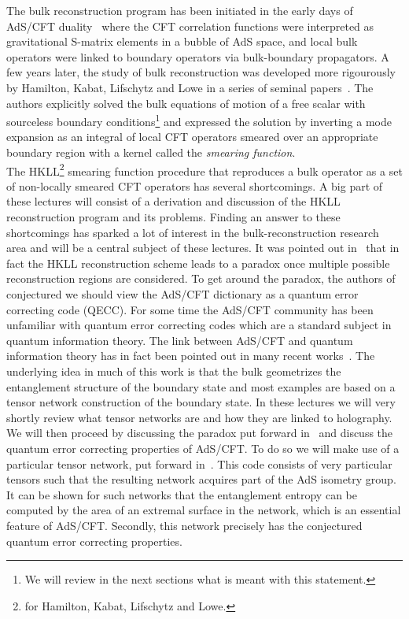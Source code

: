 \documentclass{PoS}
\begin{document}
The bulk reconstruction program has been initiated in the early days of AdS/CFT duality~\cite{Balasubramanian:1999ri,Giddings:1999qu} where the CFT correlation functions were interpreted as gravitational S-matrix elements in a bubble of AdS space, and local bulk operators were linked to boundary operators via bulk-boundary propagators. A few years later, the study of bulk reconstruction was developed more rigourously by Hamilton, Kabat, Lifschytz and Lowe in a series of seminal papers~\cite{Hamilton:2005ju,Hamilton:2006fh,Hamilton:2006az,Hamilton:2007wj}. The authors explicitly solved the bulk equations of motion of a free scalar with sourceless boundary conditions\footnote{We will review in the next sections what is meant with this statement.} and expressed the solution by inverting a mode expansion as an integral of local CFT operators smeared over an appropriate boundary region with a kernel called the \textit{smearing function}.\\

The HKLL\footnote{for Hamilton, Kabat, Lifschytz and Lowe.} smearing function procedure that reproduces a bulk operator as a set of non-locally smeared CFT operators 
has several shortcomings. A big part of these lectures will consist of a derivation and discussion of the HKLL reconstruction program and its problems. Finding an answer to these shortcomings has sparked a lot of interest in the bulk-reconstruction research area and will be a central subject of these lectures. It was pointed out in~\cite{Almheiri:2014lwa} that in fact the HKLL reconstruction scheme leads to a paradox once multiple possible reconstruction regions are considered. To get around the paradox, the authors of~\cite{Almheiri:2014lwa} conjectured we should view the AdS/CFT dictionary as a quantum error correcting code (QECC). For some time the AdS/CFT community has been unfamiliar with quantum error correcting codes which are a standard subject in quantum information theory. The link between AdS/CFT and quantum information theory has in fact been pointed out in many recent works~\cite{Swingle:2009bg,Swingle:2012wq,Qi:2013caa}. The underlying idea in much of this work is that the bulk geometrizes the entanglement structure of the boundary state and most examples are based on a tensor network construction of the boundary state. In these lectures we will very shortly review what tensor networks are and how they are linked to holography. We will then proceed by discussing the paradox put forward in~\cite{Almheiri:2014lwa} and discuss the quantum error correcting properties of AdS/CFT. To do so we will make use of a particular tensor network, put forward in~\cite{Pastawski:2015qua}. This code consists of very particular tensors such that the resulting network acquires part of the AdS isometry group. It can be shown for such networks that the entanglement entropy can be computed by the area of an extremal surface in the network, which is an essential feature of AdS/CFT. Secondly, this network precisely has the conjectured quantum error correcting properties.\\
\end{document}
